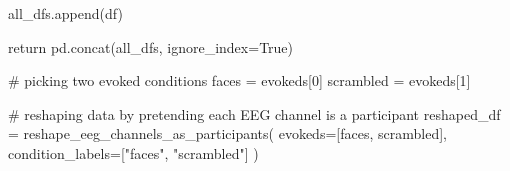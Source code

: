 \documentclass[
  man,
  floatsintext,
  longtable,
  a4paper,
  nolmodern,
  notxfonts,
  notimes,
  colorlinks=true,linkcolor=blue,citecolor=blue,urlcolor=blue]{apa7}
\newenvironment{Shaded}{\begin{snugshade}}{\end{snugshade}}
\newcommand{\CommentTok}[1]{\textcolor[rgb]{0.37,0.37,0.37}{#1}}
\newcommand{\ControlFlowTok}[1]{\textcolor[rgb]{0.00,0.23,0.31}{#1}}
\newcommand{\DecValTok}[1]{\textcolor[rgb]{0.68,0.00,0.00}{#1}}
\newcommand{\NormalTok}[1]{\textcolor[rgb]{0.00,0.23,0.31}{#1}}
\newcommand{\OperatorTok}[1]{\textcolor[rgb]{0.37,0.37,0.37}{#1}}
\newcommand{\StringTok}[1]{\textcolor[rgb]{0.13,0.47,0.30}{#1}}
\newcommand{\VariableTok}[1]{\textcolor[rgb]{0.07,0.07,0.07}{#1}}
\begin{document}
\begin{Shaded}
\begin{Highlighting}[]
\NormalTok{        all\_dfs.append(df)}

    \ControlFlowTok{return}\NormalTok{ pd.concat(all\_dfs, ignore\_index}\OperatorTok{=}\VariableTok{True}\NormalTok{)}

\CommentTok{\# picking two evoked conditions}
\NormalTok{faces }\OperatorTok{=}\NormalTok{ evokeds[}\DecValTok{0}\NormalTok{]}
\NormalTok{scrambled }\OperatorTok{=}\NormalTok{ evokeds[}\DecValTok{1}\NormalTok{]}

\CommentTok{\# reshaping data by pretending each EEG channel is a participant}
\NormalTok{reshaped\_df }\OperatorTok{=}\NormalTok{ reshape\_eeg\_channels\_as\_participants(}
\NormalTok{    evokeds}\OperatorTok{=}\NormalTok{[faces, scrambled],}
\NormalTok{    condition\_labels}\OperatorTok{=}\NormalTok{[}\StringTok{"faces"}\NormalTok{, }\StringTok{"scrambled"}\NormalTok{]}
\NormalTok{    )}
\end{Highlighting}
\end{Shaded}
\end{document}
